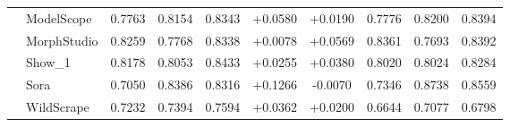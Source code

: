 \begin{table}[!t]
{\begin{tabular}{llcccccccc}
     & ModelScope & 0.7763 & 0.8154 & 0.8343 & +0.0580 & +0.0190 & 0.7776 & 0.8200 & 0.8394 \\
     & MorphStudio & 0.8259 & 0.7768 & 0.8338 & +0.0078 & +0.0569 & 0.8361 & 0.7693 & 0.8392 \\
     & Show\_1 & 0.8178 & 0.8053 & 0.8433 & +0.0255 & +0.0380 & 0.8020 & 0.8024 & 0.8284 \\
     & Sora & 0.7050 & 0.8386 & 0.8316 & +0.1266 & -0.0070 & 0.7346 & 0.8738 & 0.8559 \\
     & WildScrape & 0.7232 & 0.7394 & 0.7594 & +0.0362 & +0.0200 & 0.6644 & 0.7077 & 0.6798 \\
    \bottomrule
  \end{tabular}%
  }
\end{table}
